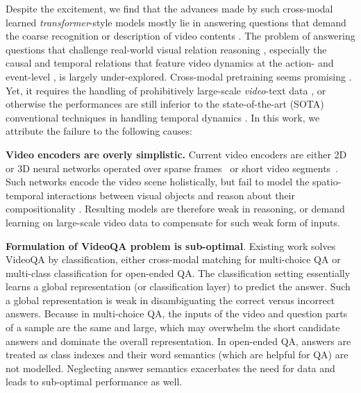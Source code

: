 \documentclass[10pt,journal,compsoc]{IEEEtran}
\newcommand{\trans}{\emph{transformer}}
\begin{document}
Despite the excitement, we find that the advances made by such cross-modal learned \trans-style models mostly lie in answering questions that demand the coarse recognition or description of video contents \cite{seo2021look,xu2017video,xu2021videoclip,yang2022learning,yu2018joint,zhu2020actbert}. The problem of answering questions that challenge real-world visual relation reasoning \cite{shang2019annotating}, especially the causal and temporal relations that feature video dynamics at the action- and event-level \cite{xiao2021next,wu2021star,li2022representation}, is largely under-explored. Cross-modal pretraining seems promising \cite{lei2021less,yu2021learning,zellers2021merlot}. Yet, it requires the handling of prohibitively large-scale \emph{video}-text data \cite{fu2021violet,zellers2021merlot}, or otherwise the performances are still inferior to the state-of-the-art (SOTA) conventional techniques in handling temporal dynamics \cite{lei2021less,yu2021learning,buch2022revisiting}. In this work, we attribute the failure to the following causes:


\textbf{Video encoders are overly simplistic.}
Current video encoders are either 2D or 3D neural networks operated over sparse frames~\cite{he2016deep,ren2015faster,dosovitskiy2020image} or short video segments~\cite{bertasius2021space,liu2021video,xie2018rethinking}. Such networks encode the video scene holistically, but fail to model the  spatio-temporal interactions between visual objects and reason about their compositionality \cite{xiao2021video}. Resulting models are therefore weak in reasoning, or demand learning on large-scale video data to compensate for such weak form of inputs.
    
\textbf{Formulation of VideoQA problem is sub-optimal}. Existing work solves VideoQA by classification, either cross-modal matching for multi-choice QA or multi-class classification for open-ended QA. The classification setting essentially learns a global representation (or classification layer) to predict the answer. Such a global representation is weak in disambiguating the correct versus incorrect answers. Because in multi-choice QA, the inputs of the video and question parts of a sample are the same and large, which may overwhelm the short candidate answers and dominate the overall representation. In open-ended QA, answers are treated as class indexes and their word semantics (which are helpful for QA) are not modelled. Neglecting answer semantics exacerbates the need for data and leads to sub-optimal performance as well.
\end{document}

